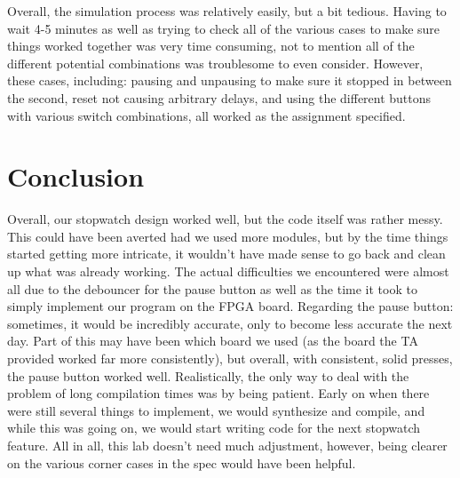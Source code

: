 \documentclass{article}
\begin{document}
	Overall, the simulation process was relatively easily, but a bit tedious.  Having to wait 4-5 minutes as well as trying to check all of the various cases to make sure things worked together was very time consuming, not to mention all of the different potential combinations was troublesome to even consider.  However, these cases, including: pausing and unpausing to make sure it stopped in between the second, reset not causing arbitrary delays, and using the different buttons with various switch combinations, all worked as the assignment specified.  


\section*{Conclusion}



Overall, our stopwatch design worked well, but the code itself was rather messy.  This could have been averted had we used more modules, but by the time things started getting more intricate, it wouldn't have made sense to go back and clean up what was already working.  The actual difficulties we encountered were almost all due to the debouncer for the pause button as well as the time it took to simply implement our program on the FPGA board.  Regarding the pause button: sometimes, it would be incredibly accurate, only to become less accurate the next day.  Part of this may have been which board we used (as the board the TA provided worked far more consistently), but overall, with consistent, solid presses, the pause button worked well.  
	Realistically, the only way to deal with the problem of long compilation times was by being patient.  Early on when there were still several things to implement, we would synthesize and compile, and while this was going on, we would start writing code for the next stopwatch feature.  All in all, this lab doesn't need much adjustment, however, being clearer on the various corner cases in the spec would have been helpful. 


%

%

\end{document}
